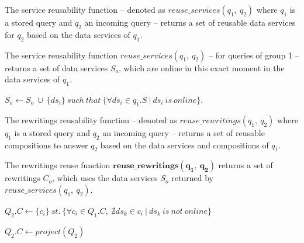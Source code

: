 The service reusability function -- denoted as $reuse\_services(q_{1},\ q_{2})$ where $q_{1}$ is a stored query and $q_{2}$ an incoming query -- returns a set of reusable data services for $q_{2}$ based on the data services of $q_{1}$.

\begin{definition}\label{def:rsqt1}
The service reusability function $reuse\_services(q_{1},\ q_{2})$ -- for queries of group 1 -- returns a set of data services $S_{o}$, which are online in this exact moment in the data services of $q_{1}$. 
\begin{center}
$ S_{o} \leftarrow S_{o} \ \cup \ \lbrace ds_{i} \rbrace\ such\ that\ \lbrace \forall ds_{i} \in q_{1}.S \ \vert \ ds_{i} \ is \ online\rbrace$.
\end{center}
\end{definition}

The rewritings reusability function -- denoted as $reuse\_rewritings(q_{1},\ q_{2})$ where $q_{1}$ is a stored query and $q_{2}$ an incoming query -- returns a set of reusable compositions to answer $q_{2}$ based on the data services and compositions of $q_{1}$.

\begin{definition}\label{def:rrqt1}
The rewritings reuse function $\mathbf{reuse\_rewritings(q_{1},\ q_{2})}$ returns a set of rewritings $C_{o}$, which uses the data services $S_{o}$ returned by $reuse\_services(q_{1},\ q_{2})$. 
\begin{center}
$Q_{2}.C \leftarrow \lbrace c_{i} \rbrace\ st.\ \lbrace \forall c_{i} \in Q_{1}.C,\ \nexists ds_{k} \in c_{i} \ \vert \ ds_{k}\ is\ not\ online \rbrace$
\end{center}
\begin{center}
$Q_{2}.C \leftarrow project(Q_{2})$
\end{center}
\end{definition}

